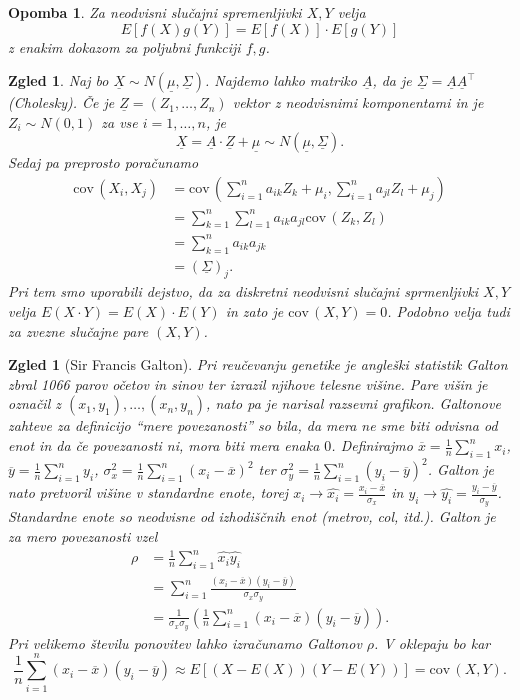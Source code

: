 \documentclass[10pt, a4paper]{article}
\newtheorem*{opomba}{Opomba}
\newtheorem{zgled}[izr]{Zgled}
\newcommand{\cov}{\mathrm{cov}\,}
\begin{document}
\begin{opomba}
  Za neodvisni slučajni spremenljivki $X, Y$ velja 
  $$E[f(X) g(Y)] = E[f(X)] \cdot E[g(Y)]$$
  z enakim dokazom za poljubni funkciji $f, g$.
\end{opomba}

\begin{zgled}
  Naj bo $\underline{X} \sim N(\underline{\mu}, \underline{\Sigma})$.
  Najdemo lahko matriko $\underline{A}$, da je $\underline{\Sigma} = \underline{A} \underline{A}^\top$ (Cholesky).
  Če je $\underline{Z} = (Z_1, \dots, Z_n)$ vektor z neodvisnimi komponentami in je 
  $Z_i \sim N(0, 1)$ za vse $i = 1, \dots, n$, je 
  $$\underline{X} = \underline{A} \cdot \underline{Z} + \underline{\mu} \sim N(\underline{\mu}, \underline{\Sigma}).$$
  Sedaj pa preprosto poračunamo 
  \begin{align*}
    \cov(X_i, X_j) &= \cov \left(\sum_{i = 1} ^n a_{ik} Z_k + \mu_i, \sum_{i = 1} ^n a_{jl} Z_l + \mu_j\right)\\
    &= \sum_{k = 1} ^n \sum_{l = 1} ^n a_{ik} a_{jl} \cov(Z_k, Z_l)\\
    &= \sum_{k = 1} ^n a_{ik} a_{jk}\\
    &= (\underline{\Sigma})_j.
  \end{align*}
  Pri tem smo uporabili dejstvo, da za diskretni neodvisni slučajni sprmenljivki $X, Y$
  velja $E(X \cdot Y) = E(X) \cdot E(Y)$ in zato je $\cov (X, Y) = 0$.
  Podobno velja tudi za zvezne slučajne pare $(X, Y)$.
\end{zgled}

\begin{zgled}[Sir Francis Galton]
  Pri reučevanju genetike je angleški statistik Galton zbral 1066 parov očetov in sinov ter 
  izrazil njihove telesne višine. Pare višin je označil z 
  $(x_1, y_1), \dots, (x_n, y_n)$, nato pa je narisal razsevni grafikon.
  Galtonove zahteve za definicijo "`mere povezanosti"' so bila, 
  da mera ne sme biti odvisna od enot in da če povezanosti ni, mora biti mera enaka $0$.
  Definirajmo $\overline{x} = \frac{1}{n} \sum_{i = 1} ^n x_i$, $\overline{y} = \frac{1}{n} \sum_{i = 1} ^n y_i$,
  $\sigma_x ^2 = \frac{1}{n} \sum_{i = 1} ^n (x_i - \overline{x})^2$ ter $\sigma_y ^2 = \frac{1}{n} \sum_{i = 1} ^n (y_i - \overline{y})^2$.
  Galton je nato pretvoril višine v standardne enote, torej 
  $x_i \to \hat{x_i} = \frac{x_i - \overline{x}}{\sigma_x}$ in $y_i \to \hat{y_i} = \frac{y_i - \overline{y}}{\sigma_y}$.
  Standardne enote so neodvisne od izhodiščnih enot (metrov, col, itd.).
  Galton je za mero povezanosti vzel 
  \begin{align*}
    \rho &= \frac{1}{n} \sum_{i = 1} ^n \hat{x_i} \hat{y_i}\\
    &= \sum_{i = 1} ^n \frac{(x_i - \overline{x}) (y_i - \overline{y})}{\sigma_x \sigma_y}\\
    &= \frac{1}{\sigma_x \sigma_y} \left(\frac{1}{n}\sum_{i = 1} ^n (x_i - \overline{x}) (y_i - \overline{y}) \right).
  \end{align*}
  Pri velikemo številu ponovitev lahko izračunamo Galtonov $\rho$. V oklepaju bo kar
  $$\frac{1}{n} \sum_{i = 1} ^n(x_i - \overline{x}) (y_i - \overline{y}) \approx E[(X - E(X)) (Y - E(Y))] = \cov(X, Y).$$
\end{zgled}
\end{document}
